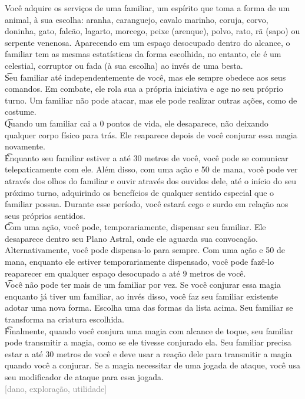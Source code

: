 \documentclass{RPG_Adventure}[2021/10/20]
\begin{document}
{\normalsize Você adquire os serviços de uma familiar, um espírito que toma a forma de um animal, à sua escolha: aranha, caranguejo, cavalo marinho, coruja, corvo, doninha, gato, falcão, lagarto, morcego, peixe (arenque), polvo, rato, rã (sapo) ou serpente venenosa. Aparecendo em um espaço desocupado dentro do alcance, o familiar tem as mesmas estatísticas da forma escolhida, no entanto, ele é um celestial, corruptor ou fada (à sua escolha) ao invés de uma besta.\\\t  Seu familiar até independentemente de você, mas ele sempre obedece aos seus comandos. Em combate, ele rola sua a própria iniciativa e age no seu próprio turno. Um familiar não pode atacar, mas ele pode realizar outras ações, como de costume.\\\t  Quando um familiar cai a 0 pontos de vida, ele desaparece, não deixando qualquer corpo físico para trás.  Ele reaparece depois de você conjurar essa magia novamente.\\\t  Enquanto seu familiar estiver a até 30 metros de você, você pode se comunicar telepaticamente com ele. Além disso, com uma ação e 50 de mana, você pode ver através dos olhos do familiar e ouvir através dos ouvidos dele, até o início do seu próximo turno, adquirindo os benefícios de qualquer sentido especial que o familiar possua. Durante esse período, você estará cego e surdo em relação aos seus próprios sentidos.\\\t  Com uma ação, você pode, temporariamente, dispensar seu familiar. Ele desaparece dentro seu Plano Astral, onde ele aguarda sua convocação. Alternativamente, você pode dispensa-lo para sempre.  Com uma ação e 50 de mana, enquanto ele estiver temporariamente dispensado, você pode fazê-lo reaparecer em qualquer espaço desocupado a até 9 metros de você.\\\t  Você não pode ter mais de um familiar por vez. Se você conjurar essa magia enquanto já tiver um familiar, ao invés disso, você faz seu familiar existente adotar uma nova forma. Escolha uma das formas da lista acima. Seu familiar se transforma na criatura escolhida.\\\t  Finalmente, quando você conjura uma magia com alcance de toque, seu familiar pode transmitir a magia, como se ele tivesse conjurado ela. Seu familiar precisa estar a até 30 metros de você e deve usar a reação dele para transmitir a magia quando você a conjurar. Se a magia necessitar de uma jogada de ataque, você usa seu modificador de ataque para essa jogada.\\}
{\scriptsize \textcolor{gray}{[dano, exploração, utilidade]\\}}
\end{document}
